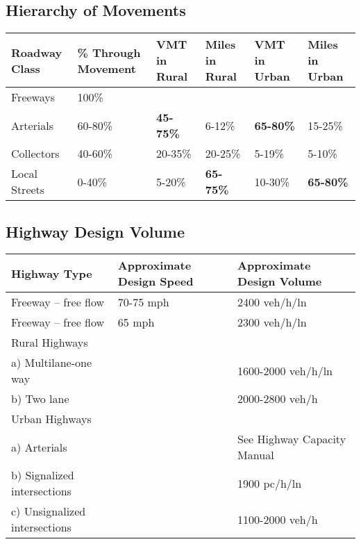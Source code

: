 \documentclass{article}
\begin{document}
  \subsection{Hierarchy of Movements}
	\begin{tabular}{|l|p{2cm}|p{2cm}|p{2cm}|p{2cm}|p{2cm}|}
	\hline
	\textbf{Roadway Class} & \textbf{\% Through Movement} & \textbf{VMT in Rural} & \textbf{Miles in Rural} & \textbf{VMT in Urban} & \textbf{Miles in Urban} \\
	\hline
	Freeways      & 100\%     &     &  \\
	Arterials     & 60-80\%   & {\bfseries 45-75\%} & 6-12\%  & {\bfseries 65-80\%}   & 15-25\% \\
	Collectors    & 40-60\%   & 20-35\% & 20-25\% & 5-19\%    & 5-10\% \\
	Local Streets & 0-40\%    & 5-20\%  & {\bfseries 65-75\%} & 10-30\%   & {\bfseries 65-80\%} \\
	\hline
	\end{tabular}

  \subsection{Highway Design Volume}
  \begin{tabular}{|l|l|l|}
  \hline
  Highway Type & Approximate Design Speed & Approximate Design Volume \\
  \hline
  Freeway – free flow & 70-75 mph & 2400 veh/h/ln \\
  Freeway – free flow & 65 mph & 2300 veh/h/ln \\
  \hline
  Rural Highways & & \\
  a) Multilane-one way & & 1600-2000 veh/h/ln \\
  b) Two lane & & 2000-2800 veh/h \\
  \hline
  Urban Highways & & \\
  a) Arterials & & See Highway Capacity Manual \\
  b) Signalized intersections & & 1900 pc/h/ln \\
  c) Unsignalized intersections & & 1100-2000 veh/h \\
  \hline
  \end{tabular}
\end{document}
